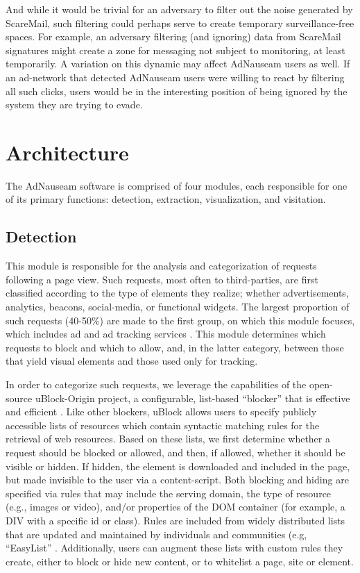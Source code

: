 \documentclass[conference]{IEEEtran}
\begin{document}
And while it would be trivial for an adversary to filter out the noise generated by ScareMail, such filtering could perhaps serve to create temporary surveillance-free spaces. For example, an adversary filtering (and ignoring) data from ScareMail signatures might create a zone for messaging not subject to monitoring, at least temporarily. A variation on this dynamic may affect AdNauseam users as well. If an ad-network that detected AdNauseam users were willing to react by filtering all such clicks, users would be in the interesting position of being ignored by the system they are trying to evade.

\section{Architecture}

The AdNauseam software is comprised of four modules, each responsible for one of its primary functions: detection, extraction, visualization, and visitation.

\subsection{Detection}

This module is responsible for the analysis and categorization of requests following a page view. Such requests, most often to third-parties, are first classified according to the type of elements they realize; whether advertisements, analytics, beacons, social-media, or functional widgets. The largest proportion of such requests (40-50\%) are made to the first group, on which this module focuses, which includes ad and ad tracking services \cite{Wills}. This module determines which requests to block and which to allow, and, in the latter category, between those that yield visual elements and those used only for tracking.

In order to categorize such requests, we leverage the capabilities of the open-source uBlock-Origin \cite{Gorhill} project, a configurable, list-based “blocker” that is effective and efficient \cite{Wills}. Like other blockers, uBlock allows users to specify publicly accessible lists of resources which contain syntactic matching rules for the retrieval of web resources. Based on these lists, we first determine whether a request should be blocked or allowed, and then, if allowed, whether it should be visible or hidden. If hidden, the element is downloaded and included in the page, but made invisible to the user via a content-script. Both blocking and hiding are specified via rules that may include the serving domain, the type of resource (e.g., images or video), and/or properties of the DOM container (for example, a DIV with a specific id or class). Rules are included from widely distributed lists that are updated and maintained by individuals and communities (e.g, “EasyList” \cite{EasyList}. Additionally, users can augment these lists with custom rules they create, either to block or hide new content, or to whitelist a page, site or element.
\end{document}
